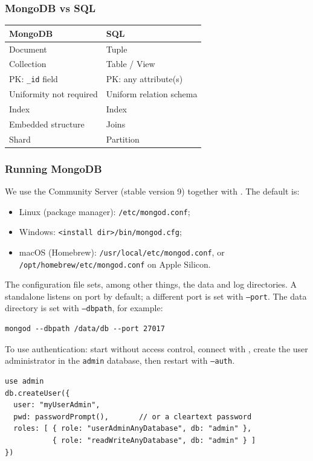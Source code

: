 \subsubsection{MongoDB vs SQL}
\begin{center}
\begin{tabular}{ll}
\toprule
\textbf{MongoDB} & \textbf{SQL} \\
\midrule
Document & Tuple \\
Collection & Table / View \\
PK: \texttt{\_id} field & PK: any attribute(s) \\
Uniformity not required & Uniform relation schema \\
Index & Index \\
Embedded structure & Joins \\
Shard & Partition \\
\bottomrule
\end{tabular}
\end{center}

\subsubsection{Running MongoDB}
We use the Community Server (stable version 9) together with . The default  is:
\begin{itemize}
  \item Linux (package manager): \texttt{/etc/mongod.conf};
  \item Windows: \texttt{<install dir>/bin/mongod.cfg};
  \item macOS (Homebrew): \texttt{/usr/local/etc/mongod.conf}, or \texttt{/opt/homebrew/etc/mongod.conf} on Apple Silicon.
\end{itemize}
The configuration file sets, among other things, the data and log directories. A standalone  listens on port  by default; a different port is set with \texttt{--port}. The data directory is set with \texttt{--dbpath}, for example:
\begin{lstlisting}
mongod --dbpath /data/db --port 27017
\end{lstlisting}

To use authentication: start  without access control, connect with , create the user administrator in the \texttt{admin} database, then restart  with \texttt{--auth}.
\begin{lstlisting}
use admin
db.createUser({
  user: "myUserAdmin",
  pwd: passwordPrompt(),       // or a cleartext password
  roles: [ { role: "userAdminAnyDatabase", db: "admin" },
           { role: "readWriteAnyDatabase", db: "admin" } ]
})
\end{lstlisting}

